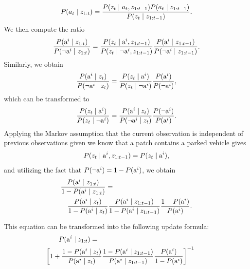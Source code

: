         \begin{equation}
        P(a_t \mid  z_{1:t} ) = \frac{P(z_t \mid a_t, z_{1:t-1}) P(a_t \mid z_{1:t-1})}{P(z_t \mid z_{1:t-1})}.
        \end{equation}
        \noindent
        We then compute the ratio
        \begin{equation}
        \frac{P({\mbox{a}^i}\mid z_{1:t})}{P(\neg{\mbox{a}^i} \mid z_{1:t})}
        =
        \frac{P(z_{t} \mid {\mbox{a}^i}, z_{1:t-1})}{P(z_{t} \mid \neg{\mbox{a}^i}, z_{1:t-1})}   \frac{P({\mbox{a}^i}\mid z_{1:t-1})}{ P(\neg{\mbox{a}^i}\mid z_{1:t-1})}.
        \end{equation}
        \noindent
        Similarly, we obtain
        \begin{equation}
        \nonumber
        \frac{P({\mbox{a}^i}\mid z_{t})}{P(\neg{\mbox{a}^i} \mid z_{t})} = \frac{P(z_{t} \mid {\mbox{a}^i})}{P(z_{t} \mid \neg{\mbox{a}^i})}   \frac{P({\mbox{a}^i})}{ P(\neg{\mbox{a}^i})},
        \end{equation}
        \noindent
        which can be transformed to
        \begin{equation}
        \frac{P(z_{t} \mid {\mbox{a}^i})}{P(z_{t} \mid \neg{\mbox{a}^i})}
        =
        \frac{P({\mbox{a}^i} \mid z_{t})}{P(\neg{\mbox{a}^i} \mid z_{t})}   \frac{P(\neg{\mbox{a}^i})}{ P({\mbox{a}^i})}.
        \end{equation}
        \noindent
        Applying the Markov assumption that the current observation is
        independent of previous observations given we know that a patch
        contains a parked vehicle gives
        \begin{equation}
        P(z_{t} \mid {\mbox{a}^i}, z_{1:t-1}) = P(z_{t} \mid {\mbox{a}^i}),
        \end{equation}
        \noindent
        and utilizing the fact that $P(\neg {\mbox{a}^i}) = 1 - P({\mbox{a}^i})$, we obtain
        \begin{eqnarray}
        \lefteqn{\frac{ P(\v \mid z_{1:t}) }{ 1 - P(\v \mid z_{1:t})} = } \nonumber \\
        &&\frac{ P( \v \mid \z)}{ 1 - P(\v \mid \z)}   \frac{ P(\v \mid \y)}{ 1 - P(\v \mid  \y)}   \frac{ 1 - P(\v)}{ P(\v)}.
        \end{eqnarray}

        \noindent
        This equation can be transformed into the following update formula:
        \begin{eqnarray}
        \label{eq:rec_update}
        \hspace{-6mm}\lefteqn{P(\v\mid z_{1:t})=} \nonumber \\
        && \hspace{-10mm} \left[ 1 + \frac{1 - P(\v\mid \z)}{P(\v \mid \z)}
           \frac{1 - P(\v \mid \y)}{P(\v \mid \y)}   \frac{P(\v)}{1 - P(\v)}  \right]^{-1}
        \end{eqnarray}
        \noindent

